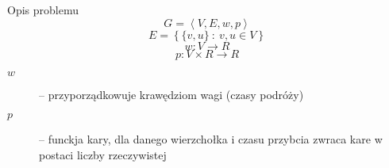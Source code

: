 \begin{block}{Opis problemu}
	\begin{equation}
		G = \left< V, E, w, p \right>
	\end{equation}
	\begin{equation}
		E = \left\{ \{v, u\} \ : \ v, u \in V \right\}
	\end{equation}
	\begin{equation}
		w : V \rightarrow R
	\end{equation}
	\begin{equation}
		p : V \times R \rightarrow R
	\end{equation}
	\begin{description}
		\item[$w$] -- przyporządkowuje krawędziom wagi (czasy podróży)
		\item[$p$] -- funckja kary, dla danego wierzchołka i czasu przybcia zwraca kare w postaci liczby rzeczywistej
	\end{description}
\end{block}
